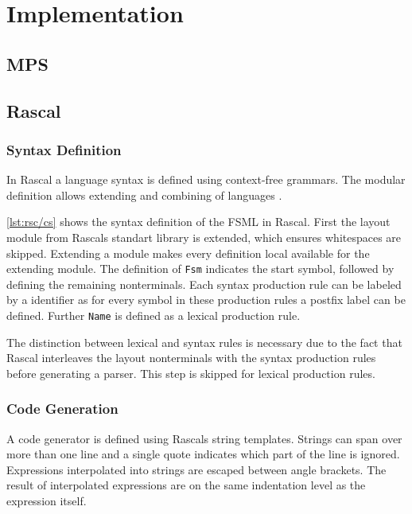 \chapter{Implementation}

\section{MPS}

\section{Rascal}

\subsection{Syntax Definition}

In Rascal a language syntax is defined using context-free grammars.
The modular definition allows extending and combining of languages \cite{van2011rascal}.

\autoref{lst:rsc/cs} shows the syntax definition of the FSML in Rascal.
First the layout module from Rascals standart library is extended, which ensures whitespaces are skipped.
Extending a module makes every definition local available for the extending module.
The definition of \lstinline[language=rascal]{Fsm} indicates the start symbol, followed by defining the remaining nonterminals.
Each syntax production rule can be labeled by a identifier as for every symbol in these production rules a postfix label can be defined.
Further \lstinline{Name} is defined as a lexical production rule.

The distinction between lexical and syntax rules is necessary due to the fact that Rascal interleaves the layout nonterminals with the syntax production rules before generating a parser.
This step is skipped for lexical production rules.



\subsection{Code Generation}

A code generator is defined using Rascals string templates.
Strings can span over more than one line and a single quote indicates which part of the line is ignored.
Expressions interpolated into strings are escaped between angle brackets.
The result of interpolated expressions are on the same indentation level as the expression itself.


